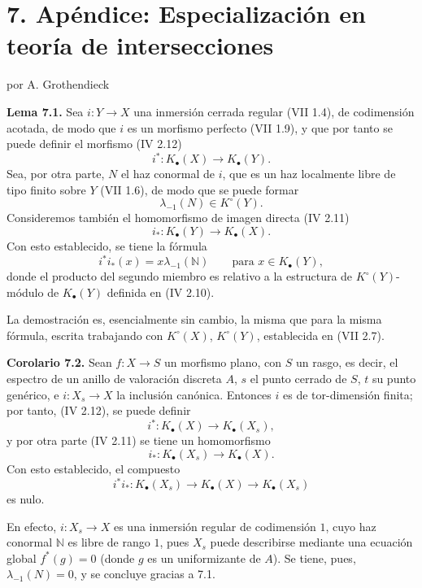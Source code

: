 
\section*{7. Apéndice: Especialización en teoría de intersecciones}
\begin{center}
por A. Grothendieck
\end{center}

\textbf{Lema 7.1.} Sea \(i:Y\to X\) una inmersión cerrada regular (VII 1.4), de codimensión acotada, de modo que \(i\) es un morfismo perfecto (VII 1.9), y que por tanto se puede definir el morfismo (IV 2.12)
\[
 i^*:K_\bullet(X)\longrightarrow K_\bullet(Y).
\]
Sea, por otra parte, \(N\) el haz conormal de \(i\), que es un haz localmente libre de tipo finito sobre \(Y\) (VII 1.6), de modo que se puede formar
\[
 \lambda_{-1}(N)\in K^\circ(Y).
\]
Consideremos también el homomorfismo de imagen directa (IV 2.11)
\[
 i_*:K_\bullet(Y)\longrightarrow K_\bullet(X).
\]
Con esto establecido, se tiene la fórmula
\[
 i^*i_*(x)=x\lambda_{-1}(\mathbb N)\qquad\text{para } x\in K_\bullet(Y),
\]
donde el producto del segundo miembro es relativo a la estructura de \(K^\circ(Y)\)-módulo de \(K_\bullet(Y)\) definida en (IV 2.10).

La demostración es, esencialmente sin cambio, la misma que para la misma fórmula, escrita trabajando con \(K^\circ(X)\), \(K^\circ(Y)\), establecida en (VII 2.7).

\textbf{Corolario 7.2.} Sean \(f:X\to S\) un morfismo plano, con \(S\) un rasgo, es decir, el espectro de un anillo de valoración discreta \(A\), \(s\) el punto cerrado de \(S\), \(t\) su punto genérico, e \(i:X_s\to X\) la inclusión canónica. Entonces \(i\) es de tor-dimensión finita; por tanto, (IV 2.12), se puede definir
\[
 i^*:K_\bullet(X)\longrightarrow K_\bullet(X_s),
\]
y por otra parte (IV 2.11) se tiene un homomorfismo
\[
 i_*:K_\bullet(X_s)\longrightarrow K_\bullet(X).
\]
Con esto establecido, el compuesto
\[
 i^*i_*:K_\bullet(X_s)\longrightarrow K_\bullet(X)\longrightarrow K_\bullet(X_s)
\]
es nulo.

En efecto, \(i:X_s\to X\) es una inmersión regular de codimensión \(1\), cuyo haz conormal \(\mathbb N\) es libre de rango \(1\), pues \(X_s\) puede describirse mediante una ecuación global \(f^*(g)=0\) (donde \(g\) es un uniformizante de \(A\)). Se tiene, pues, \(\lambda_{-1}(N)=0\), y se concluye gracias a 7.1.

